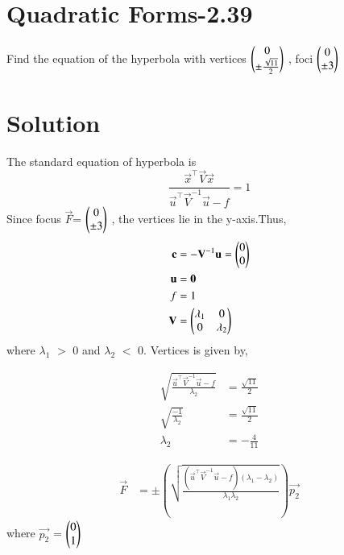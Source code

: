 \documentclass[journal,12pt,twocolumn]{IEEEtran}
\begin{document}
\section{Quadratic Forms-2.39}
Find the equation of the hyperbola with vertices
$\begin{pmatrix}0\\ \pm \frac{\sqrt{11}}{2}\end{pmatrix}$ , foci $\begin{pmatrix}0\\ \pm 3\end{pmatrix}$

\section{Solution}
The standard equation of hyperbola is
\begin{equation}
    \frac{\vec{x}^{\top}\vec{V}\vec{x}}{\vec{u}^{\top}\vec{V}^{-1}\vec{u}-f} = 1
\end{equation}
Since focus $\vec{F}$= $\begin{pmatrix}0\\ \pm 3\end{pmatrix}$ , the vertices lie in the y-axis.Thus,
\begin{align}
    \mathbf{c} &= -\mathbf{V}^{-1}\mathbf{u} = \begin{pmatrix}0\\0\end{pmatrix} \\
    \mathbf{u} &= \mathbf{0}\\
    f &= 1\\
    \mathbf{V} &= \begin{pmatrix}\lambda_1 & 0 \\ 0 & \lambda_2\end{pmatrix}
\end{align}
where $\lambda_1$ $>$ 0 and $\lambda_2$ $<$ 0.
Vertices is given by,

\begin{align}
    \sqrt{\frac{\vec{u}^{\top}\vec{V}^{-1}\vec{u}-f}{\lambda_2}} &= \frac{\sqrt{11}}{2}\\
    \sqrt{\frac{-1}{\lambda_2}} &= \frac{\sqrt{11}}{2}\\
    \lambda_2 &= -\frac{4}{11}
\end{align}

\begin{align}
    \vec{F} &= \pm \left(\sqrt{\frac{(\vec{u}^{\top}\vec{V}^{-1}\vec{u}-f)(\lambda_1-\lambda_2)}{\lambda_1 \lambda_2}}\right) \vec{p_2}
\end{align}
where $\vec{p_2}$ = $\begin{pmatrix}0\\1\end{pmatrix}$
\end{document}
